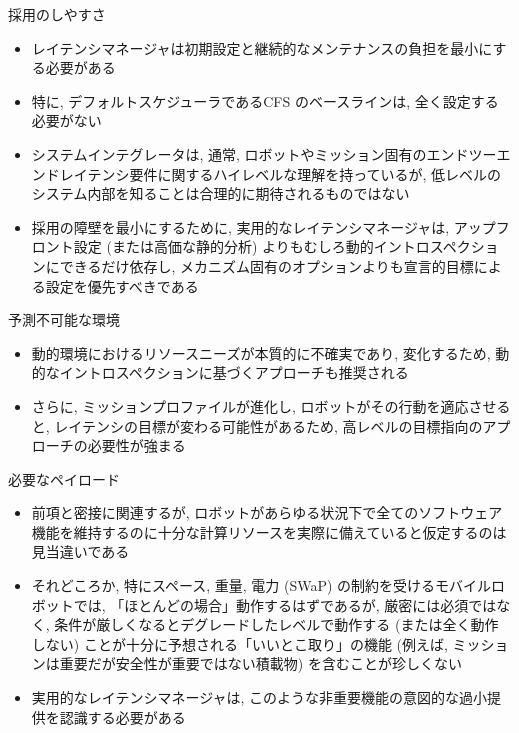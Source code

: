 \begin{frame}{採用のしやすさ}
    \begin{itemize}
        \item レイテンシマネージャは初期設定と継続的なメンテナンスの負担を最小にする必要がある
        \item 特に, デフォルトスケジューラであるCFS のベースラインは, 全く設定する必要がない
        \item システムインテグレータは, 通常, ロボットやミッション固有のエンドツーエンドレイテンシ要件に関するハイレベルな理解を持っているが, 低レベルのシステム内部を知ることは合理的に期待されるものではない
        \item 採用の障壁を最小にするために, 実用的なレイテンシマネージャは, アップフロント設定 (または高価な静的分析) よりもむしろ動的イントロスペクションにできるだけ依存し, メカニズム固有のオプションよりも宣言的目標による設定を優先すべきである
    \end{itemize}
\end{frame}

\begin{frame}{予測不可能な環境}
    \begin{itemize}
        \item 動的環境におけるリソースニーズが本質的に不確実であり, 変化するため, 動的なイントロスペクションに基づくアプローチも推奨される
        \item さらに, ミッションプロファイルが進化し, ロボットがその行動を適応させると, レイテンシの目標が変わる可能性があるため, 高レベルの目標指向のアプローチの必要性が強まる
    \end{itemize}
\end{frame}

\begin{frame}{必要なペイロード}
    \begin{itemize}
        \item 前項と密接に関連するが, ロボットがあらゆる状況下で全てのソフトウェア機能を維持するのに十分な計算リソースを実際に備えていると仮定するのは見当違いである
        \item それどころか, 特にスペース, 重量, 電力 (SWaP) の制約を受けるモバイルロボットでは, 「ほとんどの場合」動作するはずであるが, 厳密には必須ではなく, 条件が厳しくなるとデグレードしたレベルで動作する (または全く動作しない) ことが十分に予想される「いいとこ取り」の機能 (例えば, ミッションは重要だが安全性が重要ではない積載物) を含むことが珍しくない
        \item 実用的なレイテンシマネージャは, このような非重要機能の意図的な過小提供を認識する必要がある
    \end{itemize}
\end{frame}

